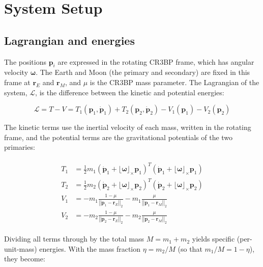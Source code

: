 \documentclass[]{article}
\newcommand{\norm}[1]{\left| \left| #1 \right| \right|_{2}}
\begin{document}
\section{System Setup}
\label{sec:setup}

\subsection{Lagrangian and energies}

The positions $\mathbf{p}_i$ are expressed in the rotating CR3BP frame, which has angular velocity $\boldsymbol{\omega}$.  The Earth and Moon (the primary and secondary) are fixed in this frame at $\mathbf{r}_E$ and $\mathbf{r}_M$, and $\mu$ is the CR3BP mass parameter.  The Lagrangian of the system, $\mathcal{L}$, is the difference between the kinetic and potential energies:

\begin{equation*}
	\mathcal{L} = T - V = T_1(\mathbf{p}_1, \dot{\mathbf{p}}_1) + T_2(\mathbf{p}_2, \dot{\mathbf{p}}_2) - V_1(\mathbf{p}_1) - V_2(\mathbf{p}_2)
\end{equation*}

The kinetic terms use the inertial velocity of each mass, written in the rotating frame, and the potential terms are the gravitational potentials of the two primaries:

\begin{align}
\begin{split}
    T_1 &= \frac{1}{2} m_1 \left(\dot{\mathbf{p}}_1 + \lfloor \boldsymbol{\omega} \rfloor_\times \mathbf{p}_1\right)^T \left(\dot{\mathbf{p}}_1 + \lfloor \boldsymbol{\omega} \rfloor_\times \mathbf{p}_1\right) \\
    T_2 &= \frac{1}{2} m_2 \left(\dot{\mathbf{p}}_2 + \lfloor \boldsymbol{\omega} \rfloor_\times \mathbf{p}_2\right)^T \left(\dot{\mathbf{p}}_2 + \lfloor \boldsymbol{\omega} \rfloor_\times \mathbf{p}_2\right) \\
    V_1 &= -m_1 \frac{1-\mu}{\norm{\mathbf{p}_1 - \mathbf{r}_E}} - m_1 \frac{\mu}{\norm{\mathbf{p}_1 - \mathbf{r}_M}} \\
    V_2 &= -m_2 \frac{1-\mu}{\norm{\mathbf{p}_2 - \mathbf{r}_E}} - m_2 \frac{\mu}{\norm{\mathbf{p}_2 - \mathbf{r}_M}}
\end{split}
\end{align}

Dividing all terms through by the total mass $M = m_1 + m_2$ yields specific (per-unit-mass) energies.  With the mass fraction $\eta = m_2 / M$ (so that $m_1 / M = 1 - \eta$), they become:
\end{document}
